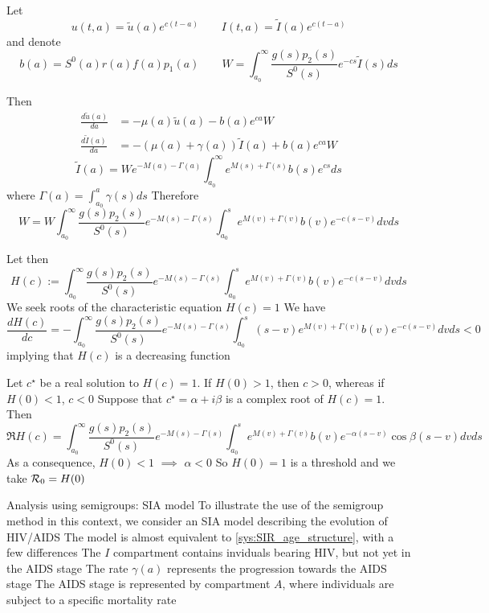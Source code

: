 \documentclass[aspectratio=169]{beamer}\usepackage[]{graphicx}\usepackage[]{xcolor}
\begin{document}
\begin{frame}
Let
\[
u(t,a)=\tilde u(a)e^{c(t-a)}\quad\quad I(t,a)=\tilde I(a)e^{c(t-a)}
\]
and denote
\[
b(a)=S^0(a)r(a)f(a)p_1(a)\quad\quad W=\int_{a_0}^\infty
\frac{g(s)p_2(s)}{S^0(s)}e^{-cs}\tilde I(s)ds
\]
\end{frame}


\begin{frame}
Then
\begin{align*}
\frac{d\tilde u(a)}{da} &= -\mu(a)\tilde u(a)-b(a)e^{ca}W \\
\frac{d\tilde I(a)}{da} &= -(\mu(a)+\gamma(a))\tilde I(a)+b(a)e^{ca}W
\end{align*}
\[
\tilde I(a)=We^{-M(a)-\Gamma(a)}\int_{a_0}^\infty
e^{M(s)+\Gamma(s)}b(s)e^{cs}ds
\]
where $\Gamma(a)=\int_{a_0}^a\gamma(s)ds$
\vfill
Therefore
\[
W=W\int_{a_0}^\infty \frac{g(s)p_2(s)}{S^0(s)}e^{-M(s)-\Gamma(s)}
\int_{a_0}^s e^{M(v)+\Gamma(v)}b(v)e^{-c(s-v)}dvds
\]
\end{frame}

\begin{frame}
Let then
\[
H(c):=\int_{a_0}^\infty \frac{g(s)p_2(s)}{S^0(s)}e^{-M(s)-\Gamma(s)}
\int_{a_0}^s e^{M(v)+\Gamma(v)}b(v)e^{-c(s-v)}dvds
\]
\vfill
We seek roots of the characteristic equation $H(c)=1$
\vfill
We have
{\footnotesize
\[
\frac{dH(c)}{dc}=-\int_{a_0}^\infty
\frac{g(s)p_2(s)}{S^0(s)}e^{-M(s)-\Gamma(s)}
\int_{a_0}^s (s-v)e^{M(v)+\Gamma(v)}b(v)e^{-c(s-v)}dvds<0
\]}
implying that $H(c)$ is a decreasing function
\end{frame}


\begin{frame}
\bbullet 
Let $c^\star$ be a real solution to $H(c)=1$. If $H(0)>1$, then $c>0$, whereas if $H(0)<1$, $c<0$
\vfill
\bbullet
Suppose that $c^\star=\alpha+i\beta$ is a complex root of $H(c)=1$. Then
{\footnotesize
\[
\Re H(c)=
\int_{a_0}^\infty \frac{g(s)p_2(s)}{S^0(s)}e^{-M(s)-\Gamma(s)}
\int_{a_0}^s e^{M(v)+\Gamma(v)}b(v)e^{-\alpha(s-v)}\cos\beta(s-v)dvds
\]}
As a consequence, $H(0)<1$ $\implies$ $\alpha<0$
\vfill
So $H(0)=1$ is a threshold and we take $\mathcal{R}_0=H(0)$
\end{frame}


\begin{frame}{Analysis using semigroups: SIA model}
To illustrate the use of the semigroup method in this context, we consider an SIA model describing the evolution of HIV/AIDS
\vfill
The model is almost equivalent to \eqref{sys:SIR_age_structure}, with a few differences
\vfill
The $I$ compartment contains inviduals bearing HIV, but not yet in the AIDS stage
\vfill
The rate $\gamma(a)$ represents the progression towards the AIDS stage
\vfill
The AIDS stage is represented by compartment $A$, where individuals are subject 
to a specific mortality rate
\end{frame}
\end{document}
